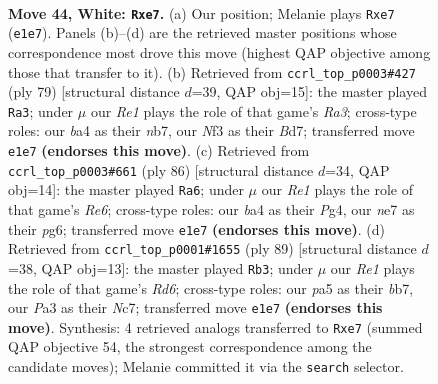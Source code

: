 \documentclass[11pt]{article}
\begin{document}
\clearpage

\begin{figure}[p]\centering
\begin{subfigure}{0.46\textwidth}\centering
\resizebox{\linewidth}{!}{%
\newchessgame
\chessboard[
  setfen={r6k/4n3/8/pp4P1/b1p2b2/P1P2N2/1B4K1/4R3 w - - 0 44},
  showmover=false,
  pgfstyle=straightmove, color=movearrow, markmove={e1-e7}
]}
\caption{}
\end{subfigure}\hfill
\begin{subfigure}{0.46\textwidth}\centering
\resizebox{\linewidth}{!}{%
\newchessgame
\chessboard[
  setfen={8/1N1b1pk1/r3p3/4P1np/8/1BR1K1P1/P7/8 b - - 5 40},
  showmover=false,
  pgfstyle=straightmove, color=movearrow, markmove={a6-a3}
]}
\caption{}
\end{subfigure}
\\[4pt]
\begin{subfigure}{0.46\textwidth}\centering
\resizebox{\linewidth}{!}{%
\newchessgame
\chessboard[
  setfen={2r3k1/7p/4R1p1/ppb5/p5P1/2P2N1P/1B4K1/8 w - - 1 44},
  showmover=false,
  pgfstyle=straightmove, color=movearrow, markmove={e6-a6}
]}
\caption{}
\end{subfigure}\hfill
\begin{subfigure}{0.46\textwidth}\centering
\resizebox{\linewidth}{!}{%
\newchessgame
\chessboard[
  setfen={6k1/1Bn2pp1/6b1/R6p/7P/3r1PP1/8/B5K1 b - - 9 45},
  showmover=false,
  pgfstyle=straightmove, color=movearrow, markmove={d3-b3}
]}
\caption{}
\end{subfigure}
\caption{\textbf{Move 44, White: \texttt{Rxe7}.} (a) Our position; Melanie plays \texttt{Rxe7} (\texttt{e1e7}). Panels (b)--(d) are the retrieved master positions whose correspondence most drove this move (highest QAP objective among those that transfer to it). (b) Retrieved from \texttt{ccrl\_top\_p0003\#427} (ply 79) [structural distance $d$=39, QAP obj=15]: the master played \texttt{Ra3}; under $\mu$ our \emph{Re1} plays the role of that game's \emph{Ra3}; cross-type roles: our \emph{b}a4 as their \emph{n}b7, our \emph{N}f3 as their \emph{B}d7; transferred move \texttt{e1e7} \textbf{(endorses this move)}. (c) Retrieved from \texttt{ccrl\_top\_p0003\#661} (ply 86) [structural distance $d$=34, QAP obj=14]: the master played \texttt{Ra6}; under $\mu$ our \emph{Re1} plays the role of that game's \emph{Re6}; cross-type roles: our \emph{b}a4 as their \emph{P}g4, our \emph{n}e7 as their \emph{p}g6; transferred move \texttt{e1e7} \textbf{(endorses this move)}. (d) Retrieved from \texttt{ccrl\_top\_p0001\#1655} (ply 89) [structural distance $d$=38, QAP obj=13]: the master played \texttt{Rb3}; under $\mu$ our \emph{Re1} plays the role of that game's \emph{Rd6}; cross-type roles: our \emph{p}a5 as their \emph{b}b7, our \emph{P}a3 as their \emph{N}c7; transferred move \texttt{e1e7} \textbf{(endorses this move)}. Synthesis: 4 retrieved analogs transferred to \texttt{Rxe7} (summed QAP objective 54, the strongest correspondence among the candidate moves); Melanie committed it via the \texttt{search} selector.}
\label{fig:thought-m86}
\end{figure}
\end{document}
